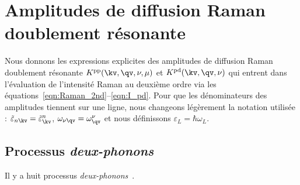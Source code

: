 \chapter{Amplitudes de diffusion Raman doublement résonante}\label{annexe:Raman}
Nous donnons les expressions explicites des amplitudes de diffusion Raman doublement résonante $K^{\text{pp}}(\kv,\qv,\nu,\mu)$ et $K^{\text{pd}}(\kv,\qv,\nu)$ qui entrent dans l'évaluation de l'intensité Raman au deuxième ordre via les équations~\eqref{eqn:Raman_2nd}--\eqref{eqn:I_pd}. Pour que les dénominateurs des amplitudes tiennent sur une ligne, nous changeons légèrement la notation utilisée : $\tilde{\varepsilon}_{n\kv}=\tilde{\varepsilon}_\kv^n$, $\omega_{\nu\qv}=\omega_\qv^\nu$ et nous définissons $\varepsilon_L=\hbar\omega_L$.
\section{Processus \textit{deux-phonons}}
Il y a huit processus \textit{deux-phonons}~\cite{venezuelaTheoryDoubleresonantRaman2011}.

